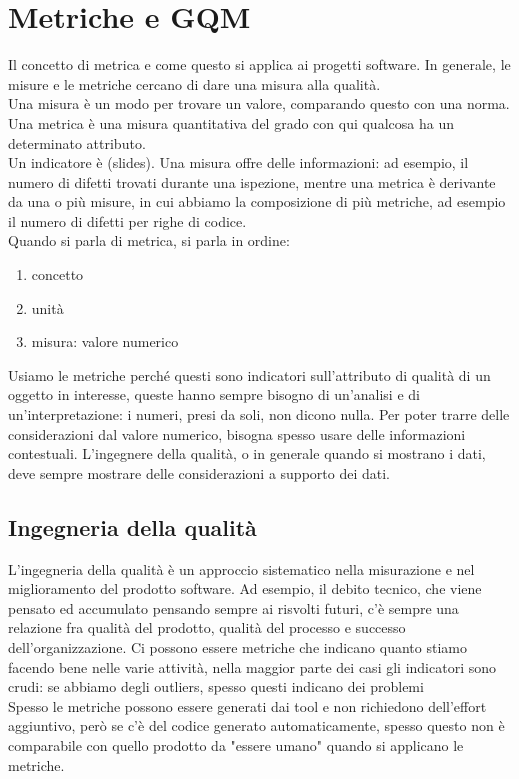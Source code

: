 \documentclass{article}
\begin{document}
\section{Metriche e GQM}
Il concetto di metrica e come questo si applica ai progetti software. In generale, le misure e le metriche cercano di dare una misura alla qualità.\\ Una misura è un modo per trovare un valore, comparando questo con una norma. Una metrica è una misura quantitativa del grado con qui qualcosa ha un determinato attributo.\\ Un indicatore è (slides). Una misura offre delle informazioni: ad esempio, il numero di difetti trovati durante una ispezione, mentre una metrica è derivante da una o più misure, in cui abbiamo la composizione di più metriche, ad esempio il numero di difetti per righe di codice.\\ Quando si parla di metrica, si parla in ordine:
\begin{enumerate}
\item concetto
\item unità
\item misura: valore numerico
\end{enumerate}
Usiamo le metriche perché questi sono indicatori sull'attributo di qualità di un oggetto in interesse, queste hanno sempre bisogno di un'analisi e di un'interpretazione: i numeri, presi da soli, non dicono nulla. Per poter trarre delle considerazioni dal valore numerico, bisogna spesso usare delle informazioni contestuali. L'ingegnere della qualità, o in generale quando si mostrano i dati, deve sempre mostrare delle considerazioni a supporto dei dati.
\subsection{Ingegneria della qualità}
L'ingegneria della qualità è un approccio sistematico nella misurazione e nel miglioramento del prodotto software. Ad esempio, il debito tecnico, che viene pensato ed accumulato pensando sempre ai risvolti futuri, c'è sempre una relazione fra qualità del prodotto, qualità del processo e successo dell'organizzazione. Ci possono essere metriche che indicano quanto stiamo facendo bene nelle varie attività, nella maggior parte dei casi gli indicatori sono crudi: se abbiamo degli outliers, spesso questi indicano dei problemi\\ Spesso le metriche possono essere generati dai tool e non richiedono dell'effort aggiuntivo, però se c'è del codice generato automaticamente, spesso questo non è comparabile con quello prodotto da "essere umano" quando si applicano le metriche.
\end{document}
